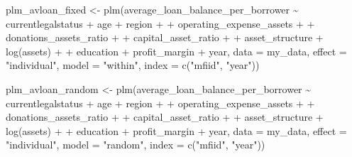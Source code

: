 \documentclass[a4paper,nobind]{templates/ociamthesis}
\newenvironment{Shaded}{\begin{snugshade}}{\end{snugshade}}
\newcommand{\AttributeTok}[1]{\textcolor[rgb]{0.77,0.63,0.00}{#1}}
\newcommand{\FunctionTok}[1]{\textcolor[rgb]{0.00,0.00,0.00}{#1}}
\newcommand{\NormalTok}[1]{#1}
\newcommand{\OtherTok}[1]{\textcolor[rgb]{0.56,0.35,0.01}{#1}}
\newcommand{\SpecialCharTok}[1]{\textcolor[rgb]{0.00,0.00,0.00}{#1}}
\newcommand{\StringTok}[1]{\textcolor[rgb]{0.31,0.60,0.02}{#1}}
\renewenvironment{Shaded}
{
  \vspace{10pt}%
  \begin{snugshade}%
}{%
  \end{snugshade}%
  \vspace{8pt}%
}
\begin{document}
\begin{landscape}
\begin{Shaded}
\begin{Highlighting}[]
\NormalTok{plm\_avloan\_fixed }\OtherTok{\textless{}{-}} \FunctionTok{plm}\NormalTok{(average\_loan\_balance\_per\_borrower }\SpecialCharTok{\textasciitilde{}}\NormalTok{ currentlegalstatus }\SpecialCharTok{+}\NormalTok{ age }\SpecialCharTok{+}\NormalTok{ region }\SpecialCharTok{+}
\SpecialCharTok{+}\NormalTok{           operating\_expense\_assets }\SpecialCharTok{+} 
\SpecialCharTok{+}\NormalTok{           donations\_assets\_ratio }\SpecialCharTok{+} 
\SpecialCharTok{+}\NormalTok{           capital\_asset\_ratio }\SpecialCharTok{+}
\SpecialCharTok{+}\NormalTok{           asset\_structure }\SpecialCharTok{+} \FunctionTok{log}\NormalTok{(assets) }\SpecialCharTok{+} 
\SpecialCharTok{+}\NormalTok{           education }\SpecialCharTok{+}\NormalTok{ profit\_margin }\SpecialCharTok{+}\NormalTok{ year, }
               \AttributeTok{data =}\NormalTok{ my\_data, }\AttributeTok{effect =} \StringTok{"individual"}\NormalTok{, }\AttributeTok{model =} \StringTok{"within"}\NormalTok{, }
      \AttributeTok{index =} \FunctionTok{c}\NormalTok{(}\StringTok{"mfiid"}\NormalTok{, }\StringTok{"year"}\NormalTok{))}

\NormalTok{plm\_avloan\_random }\OtherTok{\textless{}{-}} \FunctionTok{plm}\NormalTok{(average\_loan\_balance\_per\_borrower }\SpecialCharTok{\textasciitilde{}}\NormalTok{ currentlegalstatus }\SpecialCharTok{+}\NormalTok{ age }\SpecialCharTok{+}\NormalTok{ region }\SpecialCharTok{+}
\SpecialCharTok{+}\NormalTok{           operating\_expense\_assets }\SpecialCharTok{+} 
\SpecialCharTok{+}\NormalTok{           donations\_assets\_ratio }\SpecialCharTok{+} 
\SpecialCharTok{+}\NormalTok{           capital\_asset\_ratio }\SpecialCharTok{+}
\SpecialCharTok{+}\NormalTok{           asset\_structure }\SpecialCharTok{+} \FunctionTok{log}\NormalTok{(assets) }\SpecialCharTok{+} 
\SpecialCharTok{+}\NormalTok{           education }\SpecialCharTok{+}\NormalTok{ profit\_margin }\SpecialCharTok{+}\NormalTok{ year, }
               \AttributeTok{data =}\NormalTok{ my\_data, }\AttributeTok{effect =} \StringTok{"individual"}\NormalTok{, }\AttributeTok{model =} \StringTok{"random"}\NormalTok{, }
      \AttributeTok{index =} \FunctionTok{c}\NormalTok{(}\StringTok{"mfiid"}\NormalTok{, }\StringTok{"year"}\NormalTok{))}


\end{Highlighting}
\end{Shaded}
\end{landscape}
\end{document}
